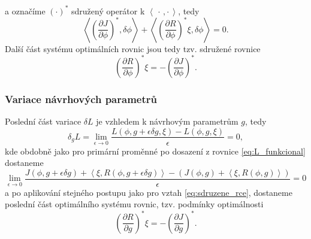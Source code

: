 a označíme $ (\cdot)^* $ sdružený operátor k $  \left\langle \, \cdot\,,\cdot \,  \right\rangle $, tedy
\begin{equation*}
\left\langle   \left(\frac{\partial J}{\partial \phi}\right)^* ,\delta\phi  \right\rangle
+  \left\langle \left(\dfrac{\partial R}{\partial \phi}\right)^* \xi ,  \delta\phi\right\rangle
=0.
\end{equation*}
Další část systému optimálních rovnic jsou tedy tzv. sdružené rovnice \cite{karman1997inverse}
\begin{equation}\label{eq:sdruzene_rce}
\left( \dfrac{\partial R}{\partial \phi} \right)^* \xi = 
- \left(\dfrac{\partial J}{\partial \phi}\right)^*.
\end{equation}

\subsubsection{Variace návrhových parametrů}

Poslední část variace $ \delta L $ je vzhledem k návrhovým parametrům $ g $, tedy
\begin{equation*}
\delta_g L =
\lim\limits_{\epsilon\rightarrow 0}
\dfrac{L(\phi,g+\epsilon\delta g,\xi)-L(\phi,g,\xi)}
{\epsilon}
=0,
\end{equation*}
kde obdobně jako pro primární proměnné po dosazení z rovnice \ref{eq:L_funkcional} dostaneme
\begin{equation*}
\lim\limits_{\epsilon\rightarrow0} \dfrac
{J(\phi, g+\epsilon\delta g) + 
	 \left\langle\xi , R(\phi, g+\epsilon\delta g)\right\rangle  -  (J(\phi, g) +  \left\langle\xi , R(\phi, g)\right\rangle)}
{\epsilon}
=0
\end{equation*}
a po aplikování stejného postupu jako pro vztah \ref{eq:sdruzene_rce}, dostaneme poslední část optimálního systému rovnic, tzv. podmínky optimálnosti \cite{karman1997inverse}
\begin{equation}\label{eq:podminky_optimalnosti}
\left( \dfrac{\partial R}{\partial g} \right)^* \xi = 
- \left(\dfrac{\partial J}{\partial g}\right)^*.
\end{equation}

